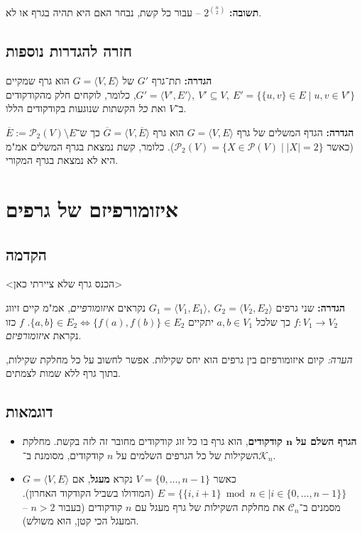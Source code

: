 \documentclass[]{article}
\newcommand\ps    {\mathcal{P}}
\newcommand\cc    {\mathcal{C}}
\newcommand\kc    {\mathcal{K}}
\newcommand\ra    {\rangle}
\newcommand\la    {\langle}
\newcommand\ol    {\overline}
\begin{document}
	\textbf{תשובה: }$2^{\binom{n}{2}}$
	 – עבור כל קשת, נבחר האם היא תהיה בגרף או לא. 
	 \subsection{חזרה להגדרות נוספות}
	 \textbf{הגדרה: }תת־גרף $G'$ של $G = \la V, E \ra$ הוא גרף שמקיים $G' = \la V', E' \ra, \ V' \subseteq V, \ E' = \{\{u, v\} \in E \mid u, v \in V'\}$, כלומר, לוקחים חלק מהקודקודים ב־$V$ ואת \textit{כל} הקשתות שנוגעות בקודקודים הללו. 
	 
	 \textbf{הגדרה: }הגדף המשלים של גרף $G = \la V, E \ra$ הוא גרף $\ol G = \la V, \ol E \ra$ כך ש־$\ol E := \ps_2(V) \setminus E$ (כאשר $\ps_2(V) = \{X \in \ps(V) \mid |X| = 2\}$). כלומר, קשת נמצאת בגרף המשלים אמ"מ היא לא נמצאת בגרף המקורי. 
	 
	 \section{איזומורפיזם של גרפים}
	 \subsection{הקדמה}
	 <הכנס גרף שלא ציירתי כאן>
	 
	 \textbf{הגדרה: }שני גרפים $G_1 = \la V_1, E_1 \ra, \ G_2 = \la V_2, E_2 \ra$ נקראים \textit{איזומורפיים}, אמ"מ קיים זיווג $f \colon V_1 \to V_2$ כך שלכל $a, b \in V_1$ יתקיים $\{a, b\} \in E_2 \iff \{f(a), f(b)\} \in E_2$. $f$ כזו נקראת \textit{איזומורפיזם}. 
	 
	 \textit{הערה: }קיום איזומורפיזם בין גרפים הוא יחס שקילות. אפשר לחשוב על כל מחלקת שקילות, בתוך גרף ללא שמות לצמתים. 
	 \subsection{דוגמאות}
	 \begin{itemize}
	 	\item \textbf{הגרף השלם על $\bm{n}$ קודקודים}, הוא גרף בו כל זוג קודקודים מחובר זה לזה בקשת. מחלקת השקילות של כל הגרפים השלמים על $n$ קודקודים, מסומנת ב־$\kc_n$. 
	 	\item $G = \la V, E \ra$ כאשר $V = \{0, \dots, n - 1\}$ נקרא \textbf{מעגל}, אם $E = \big\{\{i, i + 1\} \bmod n \in \mid i \in \{0, \dots, n - 1\} \big\}$ (המודולו בשביל הקודקוד האחרון). מסמנים ב־$\cc_n$ את מחלקת השקילות של גרף מעגל עם $n$ קודקודים (בעבור $n > 2$ – המעגל הכי קטן, הוא משולש). 
	 \end{itemize}
	 
	
\end{document}
